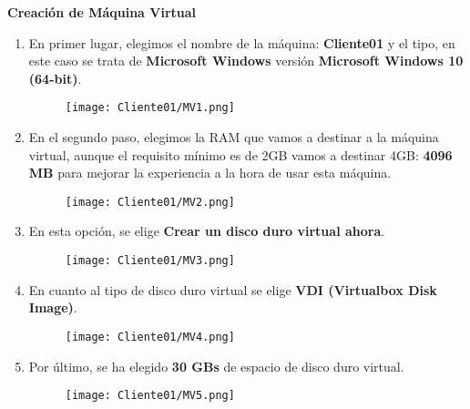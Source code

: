 \textbf{Creación de Máquina Virtual}
\begin{enumerate}

\item En primer lugar, elegimos el nombre de la máquina: \textbf{Cliente01} y el tipo, en este caso se trata de \textbf{Microsoft Windows} versión \textbf{Microsoft Windows 10 (64-bit)}.
\begin{figure}[H] %
\begin{center}
\texttt{[image: Cliente01/MV1.png]}
\end{center}
\end{figure}

\item En el segundo paso, elegimos la RAM que vamos a destinar a la máquina virtual, aunque el requisito mínimo es de 2GB vamos a destinar 4GB: \textbf{4096 MB} para mejorar la experiencia a la hora de usar esta máquina.
\begin{figure}[H] %
\begin{center}
\texttt{[image: Cliente01/MV2.png]}
\end{center}
\end{figure}

\item En esta opción, se elige \textbf{Crear un disco duro virtual ahora}.
\begin{figure}[H] %
\begin{center}
\texttt{[image: Cliente01/MV3.png]}
\end{center}
\end{figure}

\item En cuanto al tipo de disco duro virtual se elige \textbf{VDI (Virtualbox Disk Image)}.
\begin{figure}[H] %
\begin{center}
\texttt{[image: Cliente01/MV4.png]}
\end{center}
\end{figure}

\item Por último, se ha elegido \textbf{30 GBs} de espacio de disco duro virtual.
\begin{figure}[H] %
\begin{center}
\texttt{[image: Cliente01/MV5.png]}
\end{center}
\end{figure}


\end{enumerate}
